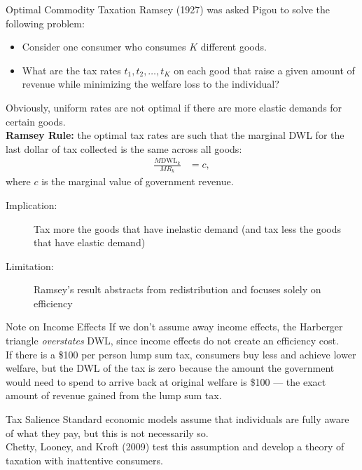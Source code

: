 \documentclass[10pt]{extarticle}
\begin{document}
  \begin{problem}{Optimal Commodity Taxation}
    Ramsey (1927) was asked Pigou to solve the following problem:
    \begin{itemize}
      \item Consider one consumer who consumes $K$ different goods.
      \item What are the tax rates $t_1,t_2,\dots,t_K$ on each good that raise a given amount of revenue while minimizing the welfare loss to the individual?
    \end{itemize}
    Obviously, uniform rates are not optimal if there are more elastic demands for certain goods.\\

    \textbf{Ramsey Rule:} the optimal tax rates are such that the marginal DWL for the last dollar of tax collected is the same across all goods:
    \begin{align*}
      \frac{M\text{DWL}_k}{MR_k} &= c, \tag*{for all $k = 1,2,\dots,K$}
    \end{align*}
    where $c$ is the marginal value of government revenue.
    \begin{description}
      \item[Implication:] Tax more the goods that have inelastic demand (and tax less the goods that have elastic demand)
      \item[Limitation:] Ramsey's result abstracts from redistribution and focuses solely on efficiency
    \end{description}
  \end{problem}
  \begin{problem}{Note on Income Effects}
    If we don't assume away income effects, the Harberger triangle \textit{overstates} DWL, since income effects do not create an efficiency cost.\\

    If there is a \$100 per person lump sum tax, consumers buy less and achieve lower welfare, but the DWL of the tax is zero because the amount the government would need to spend to arrive back at original welfare is \$100 --- the exact amount of revenue gained from the lump sum tax.
  \end{problem}
  \begin{problem}{Tax Salience}
    Standard economic models assume that individuals are fully aware of what they pay, but this is not necessarily so.\\

    Chetty, Looney, and Kroft (2009) test this assumption and develop a theory of taxation with inattentive consumers.
  \end{problem}
\end{document}
